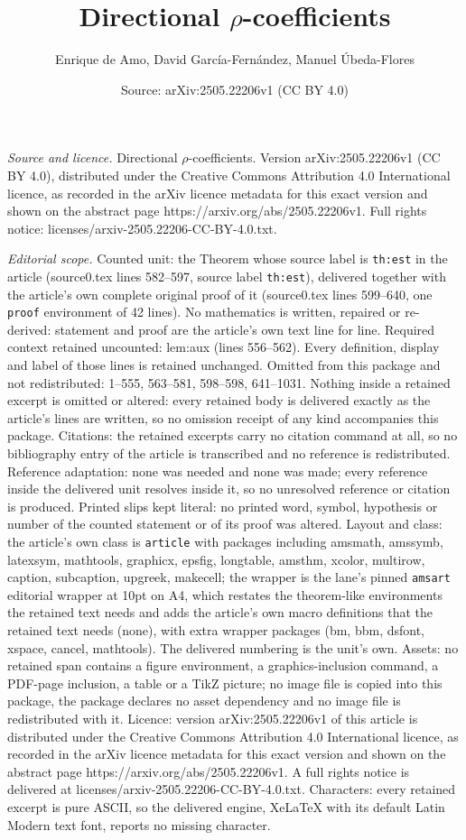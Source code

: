 \documentclass[10pt,a4paper]{amsart}
\title[Directional $\rho$-coefficients]{Directional $\rho$-coefficients}
\author{Enrique de Amo, David Garc\'ia-Fern\'andez, Manuel \'Ubeda-Flores}
\date{Source: arXiv:2505.22206v1 (CC BY 4.0)}
\begin{document}
\maketitle

\noindent\emph{Source and licence.} Directional $\rho$-coefficients. Version arXiv:2505.22206v1 (CC BY 4.0), distributed under the Creative Commons Attribution 4.0 International licence, as recorded in the arXiv licence metadata for this exact version and shown on the abstract page https://arxiv.org/abs/2505.22206v1. Full rights notice: licenses/arxiv-2505.22206-CC-BY-4.0.txt.\par\smallskip

\noindent\textit{Editorial scope.} Counted unit: the Theorem whose source label is \texttt{th:est} in the article (source0.tex lines 582--597, source label \texttt{th:est}), delivered together with the article's own complete original proof of it (source0.tex lines 599--640, one \texttt{proof} environment of 42 lines). No mathematics is written, repaired or re-derived: statement and proof are the article's own text line for line. Required context retained uncounted: lem:aux (lines 556--562). Every definition, display and label of those lines is retained unchanged. Omitted from this package and not redistributed: 1--555, 563--581, 598--598, 641--1031. Nothing inside a retained excerpt is omitted or altered: every retained body is delivered exactly as the article's lines are written, so no omission receipt of any kind accompanies this package. Citations: the retained excerpts carry no citation command at all, so no bibliography entry of the article is transcribed and no reference is redistributed. Reference adaptation: none was needed and none was made; every reference inside the delivered unit resolves inside it, so no unresolved reference or citation is produced. Printed slips kept literal: no printed word, symbol, hypothesis or number of the counted statement or of its proof was altered. Layout and class: the article's own class is \texttt{article} with packages including amsmath, amssymb, latexsym, mathtools, graphicx, epsfig, longtable, amsthm, xcolor, multirow, caption, subcaption, upgreek, makecell; the wrapper is the lane's pinned \texttt{amsart} editorial wrapper at 10pt on A4, which restates the theorem-like environments the retained text needs and adds the article's own macro definitions that the retained text needs (none), with extra wrapper packages (bm, bbm, dsfont, xspace, cancel, mathtools). The delivered numbering is the unit's own. Assets: no retained span contains a figure environment, a graphics-inclusion command, a PDF-page inclusion, a table or a TikZ picture; no image file is copied into this package, the package declares no asset dependency and no image file is redistributed with it. Licence: version arXiv:2505.22206v1 of this article is distributed under the Creative Commons Attribution 4.0 International licence, as recorded in the arXiv licence metadata for this exact version and shown on the abstract page https://arxiv.org/abs/2505.22206v1. A full rights notice is delivered at licenses/arxiv-2505.22206-CC-BY-4.0.txt. Characters: every retained excerpt is pure ASCII, so the delivered engine, XeLaTeX with its default Latin Modern text font, reports no missing character.
\end{document}
